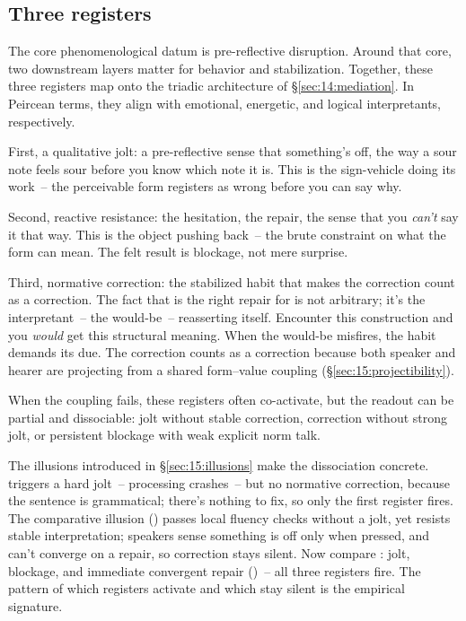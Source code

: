 \subsection{Three registers}
\label{sec:15:three-registers}

The core phenomenological datum is pre-reflective disruption. Around that core, two downstream layers matter for behavior and stabilization. Together, these three registers map onto the triadic architecture of §\ref{sec:14:mediation}. In Peircean terms, they align with emotional, energetic, and logical interpretants, respectively.

First, a qualitative jolt: a pre-reflective sense that something's off, the way a sour note feels sour before you know which note it is. This is the sign-vehicle doing its work~-- the perceivable form registers as wrong before you can say why.

Second, reactive resistance: the hesitation, the repair, the sense that you \emph{can't} say it that way. This is the object pushing back~-- the brute constraint on what the form can mean. The felt result is blockage, not mere surprise.

Third, normative correction: the stabilized habit that makes the correction count as a correction. The fact that  is the right repair for \ungram{} is not arbitrary; it's the interpretant~-- the would-be~-- reasserting itself. Encounter this construction and you \emph{would} get this structural meaning. When the would-be misfires, the habit demands its due. The correction counts as a correction because both speaker and hearer are projecting from a shared form--value coupling (§\ref{sec:15:projectibility}).

When the coupling fails, these registers often co-activate, but the readout can be partial and dissociable: jolt without stable correction, correction without strong jolt, or persistent blockage with weak explicit norm talk.

The illusions introduced in §\ref{sec:15:illusions} make the dissociation concrete.  triggers a hard jolt~-- processing crashes~-- but no normative correction, because the sentence is grammatical; there's nothing to fix, so only the first register fires. The comparative illusion () passes local fluency checks without a jolt, yet resists stable interpretation; speakers sense something is off only when pressed, and can't converge on a repair, so correction stays silent. Now compare \ungram{}: jolt, blockage, and immediate convergent repair ()~-- all three registers fire. The pattern of which registers activate and which stay silent is the empirical signature.

